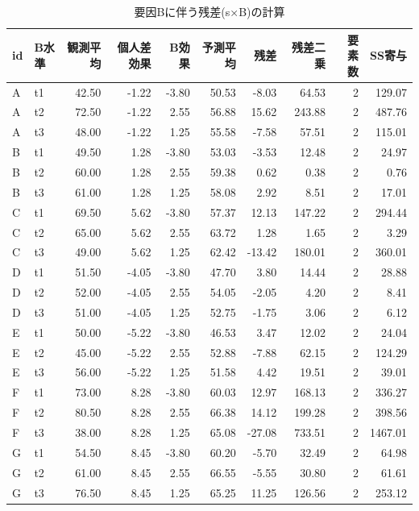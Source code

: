 \documentclass{ltjbook}
\begin{document}
\begin{table}[ht]
\centering
	\caption{要因Bに伴う残差(s×B)の計算}
	\label{tbl:21_12}
\small
\begin{tabular}{llrrrrrrrr}
  \hline
id & B水準 & 観測平均 & 個人差効果 & B効果 & 予測平均 & 残差 & 残差二乗 & 要素数 & SS寄与 \\
  \hline
A & t1 & 42.50 & -1.22 & -3.80 & 50.53 & -8.03 & 64.53 & 2 & 129.07 \\
  A & t2 & 72.50 & -1.22 & 2.55 & 56.88 & 15.62 & 243.88 & 2 & 487.76 \\
  A & t3 & 48.00 & -1.22 & 1.25 & 55.58 & -7.58 & 57.51 & 2 & 115.01 \\
  B & t1 & 49.50 & 1.28 & -3.80 & 53.03 & -3.53 & 12.48 & 2 & 24.97 \\
  B & t2 & 60.00 & 1.28 & 2.55 & 59.38 & 0.62 & 0.38 & 2 & 0.76 \\
  B & t3 & 61.00 & 1.28 & 1.25 & 58.08 & 2.92 & 8.51 & 2 & 17.01 \\
  C & t1 & 69.50 & 5.62 & -3.80 & 57.37 & 12.13 & 147.22 & 2 & 294.44 \\
  C & t2 & 65.00 & 5.62 & 2.55 & 63.72 & 1.28 & 1.65 & 2 & 3.29 \\
  C & t3 & 49.00 & 5.62 & 1.25 & 62.42 & -13.42 & 180.01 & 2 & 360.01 \\
  D & t1 & 51.50 & -4.05 & -3.80 & 47.70 & 3.80 & 14.44 & 2 & 28.88 \\
  D & t2 & 52.00 & -4.05 & 2.55 & 54.05 & -2.05 & 4.20 & 2 & 8.41 \\
  D & t3 & 51.00 & -4.05 & 1.25 & 52.75 & -1.75 & 3.06 & 2 & 6.12 \\
  E & t1 & 50.00 & -5.22 & -3.80 & 46.53 & 3.47 & 12.02 & 2 & 24.04 \\
  E & t2 & 45.00 & -5.22 & 2.55 & 52.88 & -7.88 & 62.15 & 2 & 124.29 \\
  E & t3 & 56.00 & -5.22 & 1.25 & 51.58 & 4.42 & 19.51 & 2 & 39.01 \\
  F & t1 & 73.00 & 8.28 & -3.80 & 60.03 & 12.97 & 168.13 & 2 & 336.27 \\
  F & t2 & 80.50 & 8.28 & 2.55 & 66.38 & 14.12 & 199.28 & 2 & 398.56 \\
  F & t3 & 38.00 & 8.28 & 1.25 & 65.08 & -27.08 & 733.51 & 2 & 1467.01 \\
  G & t1 & 54.50 & 8.45 & -3.80 & 60.20 & -5.70 & 32.49 & 2 & 64.98 \\
  G & t2 & 61.00 & 8.45 & 2.55 & 66.55 & -5.55 & 30.80 & 2 & 61.61 \\
  G & t3 & 76.50 & 8.45 & 1.25 & 65.25 & 11.25 & 126.56 & 2 & 253.12 \\

\end{tabular}
\end{table}
\end{document}
